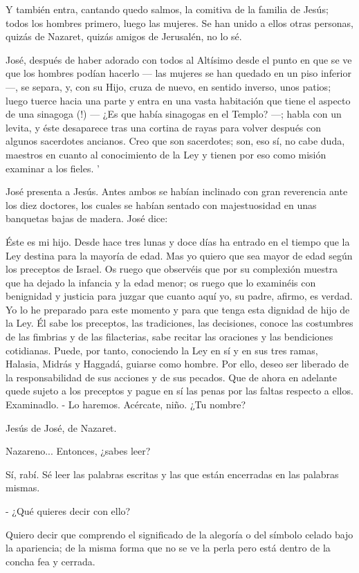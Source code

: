 \documentclass[12pt, twoside, openright]{book} %
\begin{document}
Y también entra, cantando quedo salmos, la comitiva de la familia de Jesús; todos los hombres primero, luego las mujeres. Se han unido a ellos otras personas, quizás de Nazaret, quizás amigos de Jerusalén, no lo sé. 

José, después de haber adorado con todos al Altísimo desde el punto en que se ve que los hombres podían hacerlo — las mujeres se han quedado en un piso inferior —, se separa, y, con su Hijo, cruza de nuevo, en sentido inverso, unos patios; luego tuerce hacia una parte y entra en una vasta habitación que tiene el aspecto de una sinagoga (!) — ¿Es que había sinagogas en el Templo? —; habla con un levita, y éste desaparece tras una cortina de rayas para volver después con algunos sacerdotes ancianos. Creo que son sacerdotes; son, eso sí, no cabe duda, maestros en cuanto al conocimiento de la Ley y tienen por eso como misión examinar a los fieles. ' 

José presenta a Jesús. Antes ambos se habían inclinado con gran reverencia ante los diez doctores, los cuales se habían sentado con majestuosidad en unas banquetas bajas de madera. José dice: 

Éste es mi hijo. Desde hace tres lunas y doce días ha entrado en el tiempo que la Ley destina para la mayoría de edad. Mas yo quiero que sea mayor de edad según los preceptos de Israel. Os ruego que observéis que por su complexión muestra que ha dejado la infancia y la edad menor; os ruego que lo examinéis con benignidad y justicia para juzgar que cuanto aquí yo, su padre, afirmo, es verdad. Yo lo he preparado para este momento y para que tenga esta dignidad de hijo de la Ley. Él sabe los preceptos, las tradiciones, las decisiones, conoce las costumbres de las fimbrias y de las filacterias, sabe recitar las oraciones y las bendiciones cotidianas. Puede, por tanto, conociendo la Ley en sí y en sus tres ramas, Halasia, Midrás y Haggadá, guiarse como hombre. Por ello, deseo ser liberado de la responsabilidad de sus acciones y de sus pecados. Que de ahora en adelante quede sujeto a los preceptos y pague en sí las penas por las faltas respecto a ellos. Examinadlo. - Lo haremos. Acércate, niño. ¿Tu nombre? 

Jesús de José, de Nazaret. 

Nazareno... Entonces, ¿sabes leer? 

Sí, rabí. Sé leer las palabras escritas y las que están encerradas en las palabras mismas. 

- ¿Qué quieres decir con ello? 

Quiero decir que comprendo el significado de la alegoría o del símbolo celado bajo la apariencia; de la misma forma que no se ve la perla pero está dentro de la concha fea y cerrada. 
\end{document}
